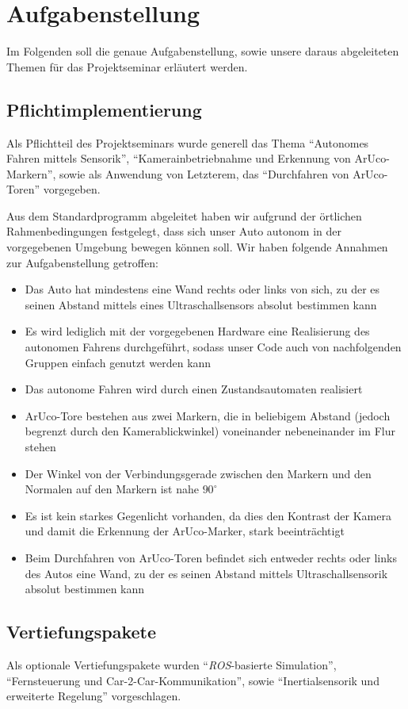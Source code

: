 \section{Aufgabenstellung}
\label{sec:aufgabenstellung}

Im Folgenden soll die genaue Aufgabenstellung, sowie unsere daraus abgeleiteten Themen für das Projektseminar erläutert werden.

\subsection{Pflichtimplementierung}
Als Pflichtteil des Projektseminars wurde generell das Thema "`Autonomes Fahren mittels Sensorik"', "`Kamerainbetriebnahme und Erkennung von ArUco-Markern"', sowie als Anwendung von Letzterem, das "`Durchfahren von ArUco-Toren"' vorgegeben.  

Aus dem Standardprogramm abgeleitet haben wir aufgrund der örtlichen Rahmenbedingungen festgelegt, dass sich unser Auto autonom in der vorgegebenen Umgebung bewegen können soll. 
Wir haben folgende Annahmen zur Aufgabenstellung getroffen:
\begin{itemize}
	\item Das Auto hat mindestens eine Wand rechts oder links von sich, zu der es seinen Abstand mittels eines Ultraschallsensors absolut bestimmen kann
	\item Es wird lediglich mit der vorgegebenen Hardware eine Realisierung des autonomen Fahrens durchgeführt, sodass unser Code auch von nachfolgenden Gruppen einfach genutzt werden kann
	\item Das autonome Fahren wird durch einen Zustandsautomaten realisiert
	\item ArUco-Tore bestehen aus zwei Markern, die in beliebigem Abstand (jedoch begrenzt durch den Kamerablickwinkel) voneinander nebeneinander im Flur stehen
	\item Der Winkel von der Verbindungsgerade zwischen den Markern und den Normalen auf den Markern ist nahe $90^\circ$
	\item Es ist kein starkes Gegenlicht vorhanden, da dies den Kontrast der Kamera und damit die Erkennung der ArUco-Marker, stark beeinträchtigt
	\item Beim Durchfahren von ArUco-Toren befindet sich entweder rechts oder links des Autos eine Wand, zu der es seinen Abstand mittels Ultraschallsensorik absolut bestimmen kann
\end{itemize}

\subsection{Vertiefungspakete}
Als optionale Vertiefungspakete wurden "`\textit{ROS}-basierte Simulation"', "`Fernsteuerung und Car-2-Car-Kommunikation"', sowie "`Inertialsensorik und erweiterte Regelung"' vorgeschlagen.

